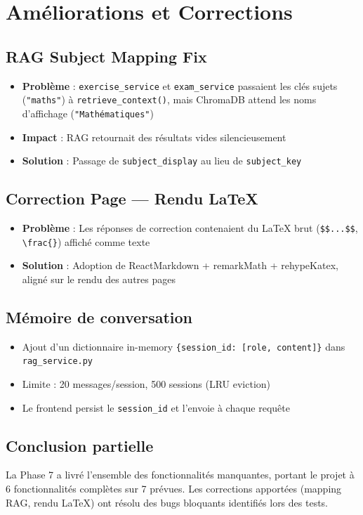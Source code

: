 \documentclass[12pt,a4paper]{report}
\begin{document}
\section{Améliorations et Corrections}

\subsection{RAG Subject Mapping Fix}
\begin{itemize}
    \item \textbf{Problème} : \texttt{exercise\_service} et \texttt{exam\_service} passaient les clés sujets (\texttt{"maths"}) à \texttt{retrieve\_context()}, mais ChromaDB attend les noms d'affichage (\texttt{"Mathématiques"})
    \item \textbf{Impact} : RAG retournait des résultats vides silencieusement
    \item \textbf{Solution} : Passage de \texttt{subject\_display} au lieu de \texttt{subject\_key}
\end{itemize}

\subsection{Correction Page — Rendu LaTeX}
\begin{itemize}
    \item \textbf{Problème} : Les réponses de correction contenaient du LaTeX brut (\texttt{\$\$...\$\$}, \texttt{\textbackslash frac\{\}}) affiché comme texte
    \item \textbf{Solution} : Adoption de ReactMarkdown + remarkMath + rehypeKatex, aligné sur le rendu des autres pages
\end{itemize}

\subsection{Mémoire de conversation}
\begin{itemize}
    \item Ajout d'un dictionnaire in-memory \texttt{\{session\_id: [{role, content}]\}} dans \texttt{rag\_service.py}
    \item Limite : 20 messages/session, 500 sessions (LRU eviction)
    \item Le frontend persist le \texttt{session\_id} et l'envoie à chaque requête
\end{itemize}

\subsection*{Conclusion partielle}
La Phase 7 a livré l'ensemble des fonctionnalités manquantes, portant le projet à 6 fonctionnalités complètes sur 7 prévues. Les corrections apportées (mapping RAG, rendu LaTeX) ont résolu des bugs bloquants identifiés lors des tests.
\end{document}

